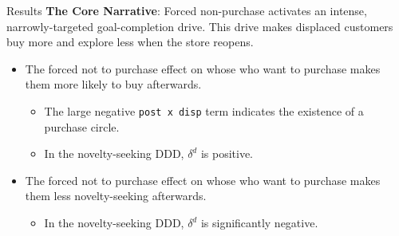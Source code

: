 \documentclass[aspectratio=169]{beamer}  %
\begin{document}
\begin{frame}{Results}
\textbf{The Core Narrative}: Forced non-purchase activates an intense, narrowly-targeted goal-completion drive. This drive makes displaced customers buy more and explore less when the store reopens.
\small
\begin{itemize}
    \item The forced not to purchase effect on whose who want to purchase makes them more likely to buy afterwards.
    \begin{itemize}
        \item The large negative \texttt{post x disp} term indicates the existence of a purchase circle.
        \item In the novelty-seeking DDD, $\delta^d$ is positive.
    \end{itemize}    
    \item The forced not to purchase effect on whose who want to purchase makes them less novelty-seeking afterwards.
    \begin{itemize}
        \item In the novelty-seeking DDD, $\delta^d$ is significantly negative.
    \end{itemize}
\end{itemize}
\end{frame}
\end{document}
